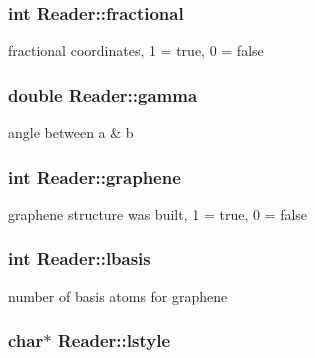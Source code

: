 \subsubsection[{fractional}]{\setlength{\rightskip}{0pt plus 5cm}int Reader\+::fractional}\label{class_reader_a913c9024181fd0fbb2dea5265fa097c1}


fractional coordinates, 1 = true, 0 = false 

\hypertarget{class_reader_ab2127a4e365fd3528c017a76375d60c4}{}
\subsubsection[{gamma}]{\setlength{\rightskip}{0pt plus 5cm}double Reader\+::gamma}\label{class_reader_ab2127a4e365fd3528c017a76375d60c4}


angle between a \& b 

\hypertarget{class_reader_aa0c8ca660b7982ecc0fcaa673a1db16b}{}
\subsubsection[{graphene}]{\setlength{\rightskip}{0pt plus 5cm}int Reader\+::graphene}\label{class_reader_aa0c8ca660b7982ecc0fcaa673a1db16b}


graphene structure was built, 1 = true, 0 = false 

\hypertarget{class_reader_afd2686bb2f2f9eec9601287385d7159e}{}
\subsubsection[{lbasis}]{\setlength{\rightskip}{0pt plus 5cm}int Reader\+::lbasis}\label{class_reader_afd2686bb2f2f9eec9601287385d7159e}


number of basis atoms for graphene 

\hypertarget{class_reader_aaaa3ec196647f9d79f39fac3db21d288}{}
\subsubsection[{lstyle}]{\setlength{\rightskip}{0pt plus 5cm}char$\ast$ Reader\+::lstyle}\label{class_reader_aaaa3ec196647f9d79f39fac3db21d288}


